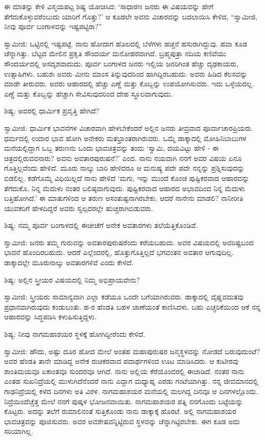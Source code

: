 ಈ ಮಾತನ್ನು ಕೇಳಿ ವಿಸ್ಮಯಪಟ್ಟ ಶಿಷ್ಯ ಯೋಚಿಸಿದ: ‘ಸಾಧಾರಣ ಜನರು ಈ ವಿಷಯವನ್ನು ಹೇಗೆ ತೆಗೆದುಕೊಳ್ಳುವರೆಂಬುದು ಯಾರಿಗೆ ಗೊತ್ತು?’ ಆ ಕೂಡಲೇ ಅವನು ವಿಚಾರವನ್ನು ಬದಲಾಯಿಸಿ ಕೇಳಿದ, “ಸ್ವಾಮೀಜಿ, ನೀವು ಪೂರ್ವ ಬಂಗಾಳವನ್ನು ಇಷ್ಟಪಟ್ಟಿರಾ?”

ಸ್ವಾಮೀಜಿ: ಒಟ್ಟಿನಲ್ಲಿ ಇಷ್ಟಪಟ್ಟೆ. ನಾನು ಹೋದಾಗ ಹೊಲದಲ್ಲಿ ಬೆಳೆಗಳು ಹಚ್ಚನೆ ಹಸುರಾಗಿದ್ದುವು. ಹವಾ ಕೂಡ ಚೆನ್ನಾಗಿತ್ತು. ಬೆಟ್ಟದ ಮೇಲಿನ ಪ್ರಕೃತಿ ಸೌಂದರ್ಯ ಮನೋಹರವಾಗಿದೆ. ಬ್ರಹ್ಮಪುತ್ರಾ ನದಿಯ ಕಣಿವೆಯು ಸೌಂದರ್ಯದಲ್ಲಿ ಅಸದೃಶವಾದುದು. ಪೂರ್ವ ಬಂಗಾಳದ ಜನರು ಇಲ್ಲಿಯ ಜನರಿಗಿಂತ ಹೆಚ್ಚು ದೃಢಕಾಯರು, ಉತ್ಸಾಹಿಗಳು. ಬಹುಶಃ ಅವರು ಮೀನು ಮಾಂಸ ತಿನ್ನುವುದರಿಂದ ಹಾಗಿದ್ದಿರಬಹುದು. ಅವರು ಹಿಡಿದ ಕೆಲಸವನ್ನು ಮಾಡೇ ತೀರುವರು. ಅವರು ಆಹಾರದಲ್ಲಿ ಹೆಚ್ಚು ಎಣ್ಣೆ ಮತ್ತು ಕೊಬ್ಬನ್ನು ಉಪಯೋಗಿಸುವರು. ಇದು ಒಳ್ಳೆಯದಲ್ಲ. ಎಣ್ಣೆ ಮತ್ತು ಕೊಬ್ಬನ್ನು ಹೆಚ್ಚಾಗಿ ಸೇವಿಸುವುದರಿಂದ ದೇಹ ಸ್ಥೂಲವಾಗುವುದು.

ಶಿಷ್ಯ: ಅವರಲ್ಲಿ ಧಾರ್ಮಿಕ ಪ್ರವೃತ್ತಿ ಹೇಗಿದೆ?

ಸ್ವಾಮೀಜಿ: ಧಾರ್ಮಿಕ ಭಾವನೆಗಳ ವಿಚಾರವಾಗಿ ಹೇಳಬೇಕೆಂದರೆ ಅಲ್ಲಿನ ಜನರು ತೀವ್ರವಾದ ಪೂರ್ವಾಚಾರಪ್ರಿಯರು. ಧರ್ಮದಲ್ಲಿ ಉದಾರ ಭಾವ ಹೋಗಿ ಅನೇಕರು ಮತಭ್ರಾಂತರಾಗಿರುವರು. ಒಮ್ಮೆ ಡಾಕ್ಕಾದಲ್ಲಿ ಮೋಹಿನಿಬಾಬುಗಳ ಮನೆಯಲ್ಲಿದ್ದಾಗ ಒಬ್ಬ ತರುಣನು ಒಂದು ಭಾವಚಿತ್ರವನ್ನು ತಂದು ‘ಸ್ವಾಮಿ, ದಯವಿಟ್ಟು ಹೇಳಿ - ಈ ಚಿತ್ರದಲ್ಲಿರುವವನಾರು? ಅವನು ಅವತಾರಪುರುಷನೆ?’ ಎಂದ. ನಾನು ನಯವಾಗಿ ನನಗೆ ಅವರ ವಿಷಯ ಏನೂ ಗೊತ್ತಿಲ್ಲವೆಂದು ಹೇಳಿದೆ. ಮೂರು ನಾಲ್ಕು ಬಾರಿ ಹೇಳಿದರೂ ಆ ಮನುಷ್ಯ ಪದೇ ಪದೇ ನನ್ನನ್ನು ಪ್ರಶ್ನಿಸುವುದನ್ನು ಬಿಡಲಿಲ್ಲ. ಕಡೆಗೊಮ್ಮೆ ವಿಧಿಯಿಲ್ಲದೆ ನಾನು ಹೇಳಿದೆ ‘ಮಗು, ಇನ್ನು ಮುಂದೆ ಕೊಂಚ ಪುಷ್ಟಿಕರವಾದ ಆಹಾರವನ್ನು ತೆಗೆದುಕೊ, ನಿನ್ನ ಮೆದುಳು ನಂತರ ಬಲಿಷ್ಠವಾಗುವುದು. ಪುಷ್ಟಿಕರವಾದ ಆಹಾರದ ಅಭಾವದಿಂದ ನಿನ್ನ ಮೆದುಳು ಬತ್ತಿಹೋಗಿದೆ.’ ಈ ಮಾತುಗಳಿಂದ ಆ ತರುಣ ಅಸಂತುಷ್ಟನಾಗಿರಬೇಕು. ಆದರೆ ನಾನೇನು ಮಾಡಲಿ? ನಾನೀರೀತಿ ಯುವಕರಿಗೆ ಹೇಳದಿದ್ದರೆ ಅವರು ಸ್ವಲ್ಪದರಲ್ಲೇ ಹುಚ್ಚರಾಗಿಬಿಡುವರು.

ಶಿಷ್ಯ: ನಮ್ಮ ಪೂರ್ವ ಬಂಗಾಳದಲ್ಲಿ ಈಚೀಚೆಗೆ ಅನೇಕ ಅವತಾರಗಳು ತಲೆಯೆತ್ತಿಕೊಂಡಿವೆ.

ಸ್ವಾಮೀಜಿ: ಜನರು ತಮ್ಮ ಗುರುವನ್ನು ಅವತಾರಪುರುಷರೆಂದು ಕರೆಯಬಹುದು. ಅವರ ವಿಷಯದಲ್ಲಿ ಅವರಿಷ್ಟಬಂದ ಭಾವನೆ ಹೊಂದಿರಬಹುದು. ಆದರೆ ಎಲ್ಲೆಂದರಲ್ಲಿ, ಹೊತ್ತುಗೊತ್ತಿಲ್ಲದೆ ಭಗವಂತನ ಅವತಾರ ಆಗುವುದಿಲ್ಲ. ಡಾಕ್ಕಾದಲ್ಲೇ ಮೂರುನಾಲ್ಕು ಅವತಾರಗಳಿವೆ ಎಂದು ಕೇಳಿದೆ.

ಶಿಷ್ಯ: ಅಲ್ಲಿನ ಸ್ತ್ರೀಯರ ವಿಷಯದಲ್ಲಿ ನಿಮ್ಮ ಅಭಿಪ್ರಾಯವೇನು?

ಸ್ವಾಮೀಜಿ: ಸ್ತ್ರೀಯರು ಸಾಮಾನ್ಯವಾಗಿ ಎಲ್ಲಾ ಕಡೆಯೂ ಒಂದೇ ಬಗೆಯಾಗಿರುವರು. ಡಾಕ್ಕಾದಲ್ಲಿ ವೈಷ್ಣವಮತವು ಪ್ರಧಾನವಾಗಿರುವುದು ಕಂಡುಬಂತು. ಹ-ರ ಹೆಂಡತಿ ಬಹಳ ಜಾಣೆಯಂತೆ ಕಾಣಿಸಿದಳು. ಬಹು ಎಚ್ಚರಿಕೆಯಿಂದ ಆಕೆ ನನ್ನ ಆಹಾರವನ್ನು ಸಿದ್ಧಪಡಿಸಿ ಕಳುಹಿಸುತ್ತಿದ್ದಳು.

ಶಿಷ್ಯ: ನೀವು ನಾಗಮಹಾಶಯರ ಸ್ಥಳಕ್ಕೆ ಹೋಗಿದ್ದೀರೆಂದು ಕೇಳಿದೆ.

ಸ್ವಾಮೀಜಿ: ಹೌದು, ಅಷ್ಟು ದೂರ ಹೋದ ಮೇಲೆ ಅಂತಹ ಮಹಾಪುರುಷರ ಜನ್ಮಸ್ಥಳವನ್ನು ನೋಡದೆ ಬರುವುದುಂಟೆ? ಅವರ ಹೆಂಡತಿ ತಾನೇ ಮಾಡಿದ್ದ ಅನೇಕ ರುಚಿಕರವಾದ ಪದಾರ್ಥಗಳಿಂದ ಊಟ ಮಾಡಿಸಿದರು. ಆ ಕುಟೀರವು ಶಾಂತಿಮಯವೂ ಏಕಾಂತವೂ ಸುಂದರವೂ ಆಗಿದೆ. ನಾನು ಅಲ್ಲಿಯ ಕೆರೆಯೊಂದರಲ್ಲಿ ಈಜಾಡಿದೆ. ನಂತರ ನಾನು ಎಂತಹ ಸುಖನಿದ್ರೆಯಲ್ಲಿ ಮುಳುಗಿದೆನೆಂದರೆ ನಾನು ಎದ್ದಾಗ ಮಧ್ಯಾಹ್ನ ಎರಡು ಗಂಟೆಯಾಗಿತ್ತು. ನನ್ನ ಜೀವಮಾನದಲ್ಲಿ ಗಾಢನಿದ್ರೆಯಲ್ಲಿ ಕಳೆದ ದಿನಗಳು ಅತಿ ವಿರಳ. ನಾಗಮಹಾಶಯರ ಮನೆಯಲ್ಲಿ ಮಲಗಿದ್ದ ದಿನವೂ ಆ ದಿನಗಳಲ್ಲೊಂದು. ನಿದ್ರೆಯಿಂದೆಚ್ಚೆತ್ತ ಮೇಲೆ ನನಗೆ ಪುಷ್ಕಳ ಭೋಜನವಾಯಿತು. ನಾಗಮಹಾಶಯರ ಪತ್ನಿ ನನಗೊಂದು ಬಟ್ಟೆಯನ್ನು ಕೊಟ್ಟರು. ಅದನ್ನು ತಲೆಗೆ ರುಮಾಲಿನಂತೆ ಸುತ್ತಿಕೊಂಡು ನಾನು ಡಾಕ್ಕಾಕ್ಕೆ ಹೊರಟೆ. ಅಲ್ಲಿ ನಾಗಮಹಾಶಯರ ಭಾವಚಿತ್ರವನ್ನು ಪೂಜಿಸುವರು. ಅವರ ಅವಶೇಷವನ್ನಿಟ್ಟಿರುವ ಸ್ಥಳವನ್ನು ಚೆನ್ನಾಗಿಟ್ಟಿರಬೇಕು. ಈಗ ಕೂಡ ಅದು ಸರಿಯಾಗಿಲ್ಲ.

